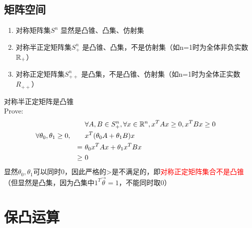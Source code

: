 \documentclass{mytemplate}
\begin{document}
\subsection{矩阵空间}
\begin{proposition}
    \hspace*{1em}
    \begin{enumerate}
        \item 对称矩阵集$S^n$ \qquad\qquad\quad 显然是凸锥、凸集、仿射集
        \item 对称半正定矩阵集$S_+^n$ \qquad 是凸锥、凸集，不是仿射集（如n=1时为全体非负实数$\mathbb{R}_+$）
        \item 对称正定矩阵集$S_{++}^n$ \qquad 是凸集，不是凸锥、仿射集（如n=1时为全体正实数$R_{++}$）
    \end{enumerate}
\end{proposition}
对称半正定矩阵是凸锥\\
Prove:
\begin{align}
     &                                   &        & \forall A,B \in S_+^n, \forall  x\in \mathbb{R}^n, x^T A x \geq 0, x^T B x \geq 0 &  & \\
     & \forall \theta_0,\theta_1 \geq 0, &        & x^T(\theta_0 A+\theta_1B)x                                                &  & \\
     &                                   & =\     & \theta_0x^T A x+\theta_1x^T B x                                           &  & \\
     &                                   & \geq\  & 0                                                                         &  &
\end{align}
显然$\theta_0, \theta_1$可以同时0，因此严格的>是不满足的，即\textcolor{red}{对称正定矩阵集合不是凸锥}\\
（但显然是凸集，因为凸集中$1^T\vec{\theta} = 1$，不能同时取0）


\section{保凸运算}
\end{document}
